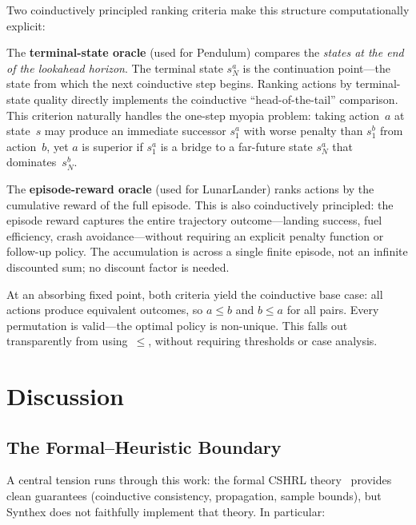 \documentclass[9pt,a4paper]{article}
\theoremstyle{plain}
\theoremstyle{definition}
\theoremstyle{remark}
\begin{document}
Two coinductively principled ranking criteria make this structure
computationally explicit:

The \textbf{terminal-state oracle} (used for Pendulum) compares
the \emph{states at the end of the lookahead horizon}.
The terminal state $s_N^a$ is the continuation point---the state
from which the next coinductive step begins. Ranking actions by
terminal-state quality directly implements the coinductive
``head-of-the-tail'' comparison. This criterion naturally handles
the one-step myopia problem: taking action~$a$ at state~$s$ may
produce an immediate successor $s_1^a$ with worse penalty than
$s_1^b$ from action~$b$, yet $a$ is superior if $s_1^a$ is a
bridge to a far-future state $s_N^a$ that dominates~$s_N^b$.

The \textbf{episode-reward oracle} (used for LunarLander) ranks
actions by the cumulative reward of the full episode. This is
also coinductively principled: the episode reward captures the
entire trajectory outcome---landing success, fuel efficiency,
crash avoidance---without requiring an explicit penalty function
or follow-up policy. The accumulation is across a single
finite episode, not an infinite discounted sum; no discount
factor is needed.

At an absorbing fixed point, both criteria yield the coinductive
base case: all actions produce equivalent outcomes, so
$a \le b$ and $b \le a$ for all pairs. Every permutation is
valid---the optimal policy is non-unique. This falls out
transparently from using~$\le$, without requiring thresholds or
case analysis.

\section{Discussion}

\subsection{The Formal--Heuristic Boundary}

A central tension runs through this work: the formal CSHRL
theory~\cite{CSHRL2026,CSHRLSynthesis2026} provides clean
guarantees (coinductive consistency, propagation, sample bounds),
but Synthex does not faithfully implement that theory.  In
particular:
\end{document}
